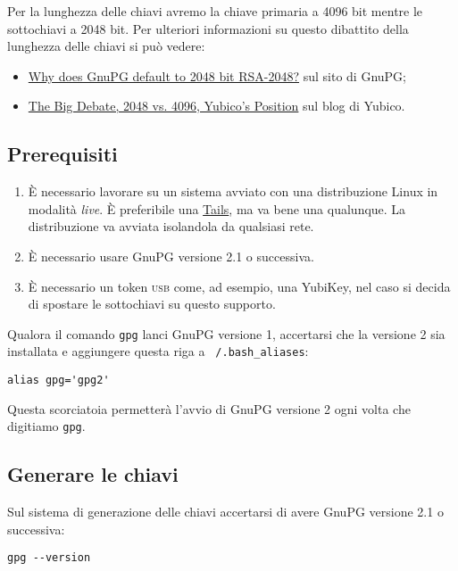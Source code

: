\documentclass[a4paper,10pt]{article}
\begin{document}
Per la lunghezza delle chiavi avremo la chiave primaria a 4096 bit mentre le sottochiavi a 2048 bit. Per ulteriori informazioni su questo dibattito della lunghezza delle chiavi si può vedere:

\begin{itemize}
 \item \href{https://www.gnupg.org/faq/gnupg-faq.html#default_rsa2048}{Why does GnuPG default to 2048 bit RSA-2048?} sul sito di GnuPG;
 \item \href{https://www.yubico.com/2015/02/big-debate-2048-4096-yubicos-stand/}{The Big Debate, 2048 vs. 4096, Yubico’s Position} sul blog di Yubico.
\end{itemize}

\subsection{Prerequisiti}

\begin{enumerate}
 \item È necessario lavorare su un sistema avviato con una distribuzione Linux in modalità \textit{live}. È preferibile una \href{https://tails.boum.org/index.it.html}{Tails}, ma va bene una qualunque. La distribuzione va avviata isolandola da qualsiasi rete.
 \item È necessario usare GnuPG versione 2.1 o successiva.
 \item È necessario un token \textsc{usb} come, ad esempio, una YubiKey, nel caso si decida di spostare le sottochiavi su questo supporto.
\end{enumerate}

Qualora il comando \texttt{gpg} lanci GnuPG versione 1, accertarsi che la versione 2 sia installata e aggiungere questa riga a \texttt{~/.bash\_aliases}:

\begin{lstlisting}
alias gpg='gpg2'
\end{lstlisting}

Questa scorciatoia permetterà l'avvio di GnuPG versione 2 ogni volta che digitiamo \texttt{gpg}.

\subsection{Generare le chiavi}

Sul sistema di generazione delle chiavi accertarsi di avere GnuPG versione 2.1 o successiva:

\begin{lstlisting}
gpg --version
\end{lstlisting}
\end{document}
